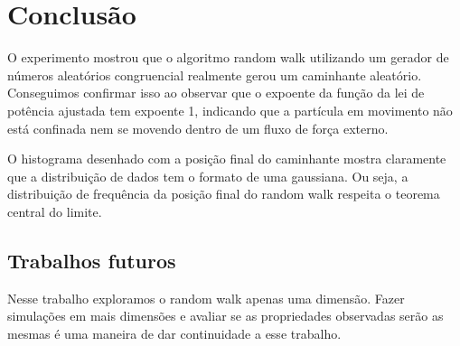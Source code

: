 
\chapter{Conclusão}
\label{chap_conclusao}

O experimento mostrou que o algoritmo random walk utilizando um gerador de números aleatórios congruencial realmente gerou um caminhante aleatório. Conseguimos confirmar isso ao observar que o expoente da função da lei de potência ajustada tem expoente 1, indicando que a partícula em movimento não está confinada nem se movendo dentro de um fluxo de força externo.

O histograma desenhado com a posição final do caminhante mostra claramente que a distribuição de dados tem o formato de uma gaussiana. Ou seja, a distribuição de frequência da posição final do random walk respeita o teorema central do limite.

\section{Trabalhos futuros}
\label{sec_trabalhos_futuros}

Nesse trabalho exploramos o random walk apenas uma dimensão. Fazer simulações em mais dimensões e avaliar se as propriedades observadas serão as mesmas é uma maneira de dar continuidade a esse trabalho.  

